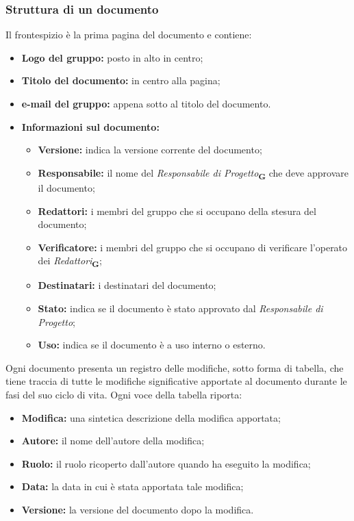 \subsubsection{Struttura di un documento}
Il frontespizio è la prima pagina del documento e contiene:
\begin{itemize}
    \item \textbf{Logo del gruppo:} posto in alto in centro;
    \item \textbf{Titolo del documento:} in centro alla pagina;
    \item \textbf{e-mail del gruppo:} appena sotto al titolo del documento.
    \item \textbf{Informazioni sul documento:}
          \begin{itemize}
              \item \textbf{Versione:} indica la versione corrente del documento;
              \item \textbf{Responsabile:} il nome del \textit{Responsabile di Progetto}\textsubscript{\textbf{G}} che deve approvare il documento;
              \item \textbf{Redattori:} i membri del gruppo che si occupano della stesura del documento;
              \item \textbf{Verificatore:} i membri del gruppo che si occupano di verificare l'operato dei \textit{Redattori}\textsubscript{\textbf{G}};
              \item \textbf{Destinatari:} i destinatari del documento;
              \item \textbf{Stato:} indica se il documento è stato approvato dal \textit{Responsabile di Progetto};
              \item \textbf{Uso:} indica se il documento è a uso interno o esterno.
          \end{itemize}
\end{itemize}
Ogni documento presenta un registro delle modifiche, sotto forma di tabella, che tiene traccia di tutte le modifiche significative apportate al documento durante le fasi del suo ciclo di vita. Ogni voce della tabella riporta:
\begin{itemize}
    \item \textbf{Modifica:} una sintetica descrizione della modifica apportata;
    \item \textbf{Autore:} il nome dell'autore della modifica;
    \item \textbf{Ruolo:} il ruolo ricoperto dall'autore quando ha eseguito la modifica;
    \item \textbf{Data:} la data in cui è stata apportata tale modifica;
    \item \textbf{Versione:} la versione del documento dopo la modifica.
\end{itemize}
